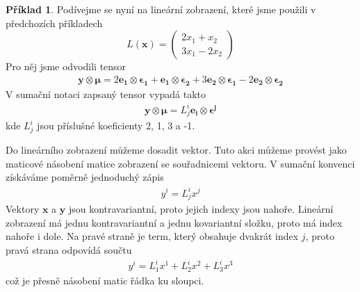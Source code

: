 \documentclass[a5paper,12pt]{amsbook}
\theoremstyle{definition}
\newtheorem{example}{Příklad}[chapter]
\newcommand{\myvec}[1]{\bm{#1}}
\begin{document}
\begin{example}
Podívejme se nyní na lineární zobrazení, které jsme použili v předchozích příkladech
\begin{equation*}
L(\myvec{x}) = \left(
\begin{array}{c}
2 x_1 + x_2 \\
3x_1 - 2 x_2
\end{array}
\right)
\end{equation*}
Pro něj jsme odvodili tensor
\begin{equation*}
\begin{split}
\myvec{y}\otimes\myvec{\mu} 
= 2\myvec{e_1}\otimes\myvec{\epsilon_1}
+ \myvec{e_1}\otimes\myvec{\epsilon_2}
+ 3\myvec{e_2}\otimes\myvec{\epsilon_1}
- 2\myvec{e_2}\otimes\myvec{\epsilon_2}
\end{split}
\end{equation*}
V sumační notaci zapsaný tensor vypadá takto
\begin{equation*}
\begin{split}
\myvec{y}\otimes\myvec{\mu} = L^i_j \myvec{e_i}\otimes\myvec{\epsilon^j}
\end{split}
\end{equation*}
kde $L^i_j$ jsou příslušné koeficienty 2, 1, 3 a -1.

Do lineárního zobrazení můžeme dosadit vektor. Tuto akci můžeme provést jako maticové násobení
matice zobrazení se souřadnicemi vektoru. V sumační konvenci získáváme poměrně jednoduchý
zápis
\begin{equation*}
\begin{split}
y^i = L^i_j x^j
\end{split}
\end{equation*}
Vektory $\myvec{x}$ a $\myvec{y}$ jsou kontravariantní, proto jejich indexy jsou nahoře. Lineární
zobrazení má jednu kontravariantní a jednu kovariantní složku, proto má index nahoře i dole. Na pravé
straně je term, který obsahuje dvakrát index $j$, proto pravá strana odpovídá součtu
\begin{equation*}
\begin{split}
y^i = L^i_1 x^1 + L^i_2 x^2 + L^i_3 x^3
\end{split}
\end{equation*}
což je přesně násobení matic řádka ku sloupci.
\end{example}
\end{document}
